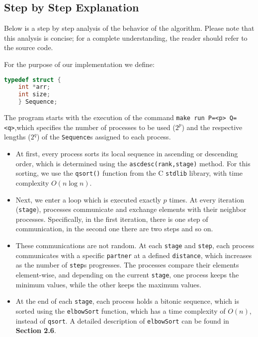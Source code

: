 \documentclass[12pt]{article}
\begin{document}
\subsection{Step by Step Explanation}

Below is a step by step analysis of the behavior of the algorithm. Please note that this analysis is concise; for a complete understanding, the reader should refer to the source code.

For the purpose of our implementation we define:
\begin{lstlisting}[language=C]
    typedef struct {
    int *arr;
    int size;
    } Sequence;
\end{lstlisting}

 The program starts with the execution of the command \texttt{make run P=<p> Q=<q>},which specifies the number of processes to be used (\(2^p\)) and the respective lengths (\(2^q\)) of the \texttt{Sequence}s assigned to each process.

\begin{itemize}
    \item At first, every process sorts its local sequence in ascending or descending order, which is determined using the \texttt{ascdesc(rank,stage)} method. For this sorting, we use the \texttt{qsort()} function from the C \texttt{stdlib} library, with time complexity \(O(n \log n)\).
    
    \item Next, we enter a loop which is executed exactly \(p\) times. At every iteration (\texttt{stage}), processes communicate and exchange elements with their neighbor processes. Specifically, in the first iteration, there is one step of communication, in the second one there are two steps and so on.
    
    \item These communications are not random. At each \texttt{stage} and \texttt{step}, each process communicates with a specific \texttt{partner} at a defined \texttt{distance}, which increases as the number of \texttt{step}s progresses. The processes compare their elements element-wise, and depending on the current \texttt{stage}, one process keeps the minimum values, while the other keeps the maximum values.
    
    \item At the end of each \texttt{stage}, each process holds a bitonic sequence, which is sorted using the \texttt{elbowSort} function, which has a time complexity of \(O(n)\), instead of \texttt{qsort}. A detailed description of \texttt{elbowSort} can be found in \textbf{Section 2.6}.
\end{itemize}
\end{document}

